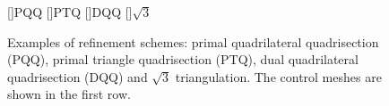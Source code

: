 \documentclass[twocolumn]{article}
\begin{document}
\begin{figure}[tb]
  \centering
  []{\scriptsize PQQ} 
  []{\scriptsize PTQ}
  []{\scriptsize DQQ} 
  []{\scriptsize $\sqrt{3}$} 
  \caption{Examples of refinement schemes: 
    primal quadrilateral quadrisection (PQQ),
    primal triangle quadrisection (PTQ),
    dual quadrilateral quadrisection (DQQ) and
    $\sqrt{3}$ triangulation. The control meshes are shown
    in the first row.}
  \label{fig:RefSchemes}
\end{figure}


 




\end{document}
